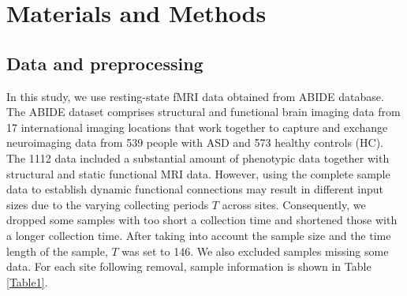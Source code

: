 \documentclass[a4paper]{cas-dc}
\begin{document}









\section{Materials and Methods}\label{Materials and Methods}
\subsection{Data and preprocessing}
In this study, we use resting-state fMRI data obtained from ABIDE database. The ABIDE dataset comprises structural and functional brain imaging data from 17 international imaging locations that work together to capture and exchange neuroimaging data from 539 people with ASD and 573 healthy controls (HC). The 1112 data included a substantial amount of phenotypic data together with structural and static functional MRI data. However, using the complete sample data to establish dynamic functional connections may result in different input sizes due to the varying collecting periods $T$ across sites. Consequently, we dropped some samples with too short a collection time and shortened those with a longer collection time. After taking into account the sample size and the time length of the sample, $T$ was set to 146. We also excluded samples missing some data. For each site following removal, sample information is shown in Table \ref{Table1}.
\end{document}
